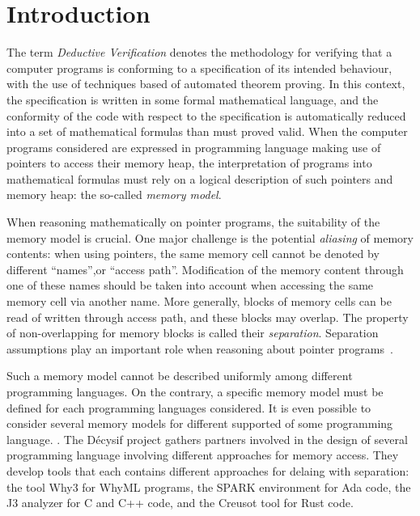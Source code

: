 \documentclass[a4paper,twoside]{article}
\begin{document}
\sloppy{}
\makeRR   %


\tableofcontents
\clearpage

\listoffigures

\clearpage

\section{Introduction}

The term \emph{Deductive Verification} denotes the methodology for verifying
that a computer programs is conforming to a specification of its intended
behaviour, with the use of techniques based of automated theorem proving. In
this context, the specification is written in some formal mathematical language,
and the conformity of the code with respect to the specification is
automatically reduced into a set of mathematical formulas than must proved
valid. When the computer programs considered are expressed in programming
language making use of pointers to access their memory heap, the interpretation
of programs into mathematical formulas must rely on a logical description of
such pointers and memory heap: the so-called \emph{memory model}.

When reasoning mathematically on pointer programs, the suitability of the memory
model is crucial. One major challenge is the potential \emph{aliasing} of memory
contents: when using pointers, the same memory cell cannot be denoted by
different ``names'',or ``access path''. Modification of the memory content
through one of these names should be taken into account when accessing the same
memory cell via another name. More generally, blocks of memory cells can be read
of written through access path, and these blocks may overlap. The property of
non-overlapping for memory blocks is called their \emph{separation}. Separation
assumptions play an important role when reasoning about pointer
programs~\cite{bornat00mpc}.

Such a memory model cannot be described uniformly among different programming
languages. On the contrary, a specific memory model must be defined for each
programming languages considered. It is even possible to consider several memory
models for different supported of some programming language. . The Décysif project gathers partners involved in the design of several
programming language involving different approaches for memory access. They
develop tools that each contains different approaches for delaing with
separation: the tool Why3 for WhyML programs, the SPARK environment for Ada
code, the J3 analyzer for C and C++ code, and the Creusot tool for Rust code.
\end{document}
